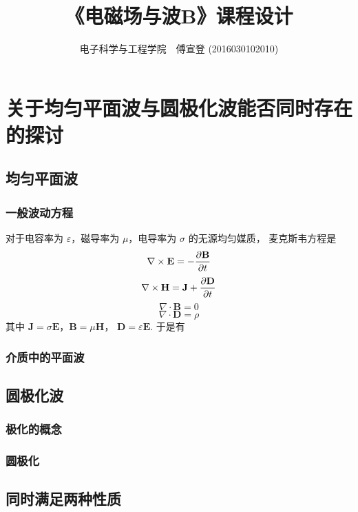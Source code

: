 \documentclass[UTF8,linespread=1.236]{ctexart}
\newcommand\cu[1]{\mathbf{#1}}
\newcommand\pypx[2]{{{\partial {#1}} \over {\partial {#2}}}}
\begin{document}
\title{《电磁场与波B》课程设计}
\author{电子科学与工程学院\ \ 傅宣登 (2016030102010)}

\maketitle

\section{关于均匀平面波与圆极化波能否同时存在的探讨}

\subsection{均匀平面波}

\subsubsection{一般波动方程}

对于电容率为 $\varepsilon$，磁导率为 $\mu$，电导率为 $\sigma$
的无源均匀媒质，
麦克斯韦方程是
\begin{equation}%
    \nabla \times \mathbf{E} = - \pypx{\mathbf{B}}{t}
\end{equation}
\begin{equation}
    \nabla \times \mathbf{H} = \mathbf{J} + \pypx{\mathbf{D}}{t}
\end{equation}
\begin{equation}
    \nabla \cdot \mathbf{B} = 0
\end{equation}
\begin{equation}
    \nabla \cdot \mathbf{D} = \rho
\end{equation}
其中 $\mathbf{J} = \sigma\mathbf{E}$，$\cu{B} = \mu\cu{H}$，
$\cu{D} = \varepsilon\cu{E}$. 于是有



\subsubsection{介质中的平面波}

\subsection{圆极化波}

\subsubsection{极化的概念}

\subsubsection{圆极化}

\subsection{同时满足两种性质}


\end{document}
